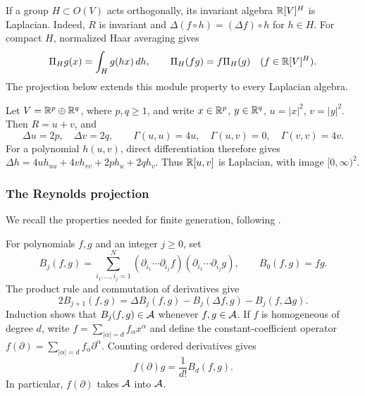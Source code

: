\begin{example}
\label{ex:orthogonal-laplacian}
If a group \(H\subset O(V)\) acts orthogonally, its invariant algebra
\(\mathbb R[V]^H\) is Laplacian. Indeed, \(R\) is invariant and
\(\Delta(f\circ h)=(\Delta f)\circ h\) for \(h\in H\).
For compact \(H\), normalized Haar averaging gives
\[
 \Pi_Hg(x)=\int_H g(hx)\,dh,
 \qquad \Pi_H(fg)=f\Pi_H(g)\quad(f\in\mathbb R[V]^H).
\]
The projection below extends this module property to every Laplacian algebra.
\end{example}

\begin{example}
\label{ex:two-block-laplacian-background}
Let \(V=\mathbb R^p\oplus\mathbb R^q\), where \(p,q\geq1\), and write
\(x\in\mathbb R^p\), \(y\in\mathbb R^q\), \(u=|x|^2\), \(v=|y|^2\). Then \(R=u+v\), and
\[
 \Delta u=2p,\quad \Delta v=2q,\qquad
 \Gamma(u,u)=4u,\quad \Gamma(u,v)=0,\quad \Gamma(v,v)=4v.
\]
For a polynomial \(h(u,v)\), direct differentiation therefore gives \(\Delta h=4u h_{uu}+4v h_{vv}+2p h_u+2q h_v\).
Thus \(\mathbb R[u,v]\) is Laplacian, with image \([0,\infty)^2\).
\end{example}

\subsubsection{The Reynolds projection}

We recall the properties needed for finite generation, following
\cite[Lemma~21, Corollary~22, and
Theorem~23]{MendesRadeschi}.

For polynomials \(f,g\) and an integer \(j\geq0\), set
\[
 B_j(f,g)=\sum_{i_1,\ldots,i_j=1}^N
 (\partial_{i_1}\cdots\partial_{i_j}f)
 (\partial_{i_1}\cdots\partial_{i_j}g),
 \qquad B_0(f,g)=fg.
\]
The product rule and commutation of derivatives give
\begin{equation}\label{eq:MR-higher-contraction}
 2B_{j+1}(f,g)=\Delta B_j(f,g)-B_j(\Delta f,g)-B_j(f,\Delta g).
\end{equation}
Induction shows that \(B_j(f,g)\in\mathcal A\) whenever \(f,g\in\mathcal A\).
If \(f\) is homogeneous of degree \(d\), write
\(f=\sum_{|\alpha|=d}f_\alpha x^\alpha\) and define the
constant-coefficient operator
\(f(\partial)=\sum_{|\alpha|=d}f_\alpha\partial^\alpha\).
Counting ordered derivatives gives
\begin{equation}\label{eq:MR-dual-operator}
 f(\partial)g=\frac1{d!}B_d(f,g).
\end{equation}
In particular, \(f(\partial)\) takes \(\mathcal A\) into \(\mathcal A\).


